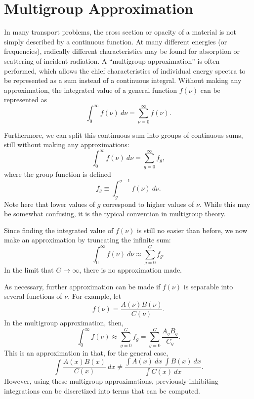 \section{Multigroup Approximation}\label{apxMultigroup}

In many transport problems, the cross section or opacity of a material is not
simply described by a continuous function.  At many different energies (or
frequencies), radically different characteristics may be found for absorption
or scattering of incident radiation.  A ``multigroup approximation'' is often
performed, which allows the chief characteristics of individual energy spectra
to be represented as a sum instead of a continuous integral.  Without making
any approximation, the integrated value of a general function $f(\nu)$ can be
represented as
\[\int_0^\infty f(\nu)\ d\nu = \sum_{\nu=0}^\infty f(\nu).\]

Furthermore, we can split this continuous sum into groups of continuous sums,
still without making any approximations:
\[\int_0^\infty f(\nu)\ d\nu = \sum_{g=0}^\infty f_g,\]
where the group function is defined
\[f_g\equiv\int_g^{g-1} f(\nu)\ d\nu.\]
Note here that lower values of $g$ correspond to higher values of $\nu$.  While
this may be somewhat confusing, it is the typical convention in multigroup
theory.

Since finding the integrated value of $f(\nu)$ is still no easier than before,
we now make an approximation by truncating the infinite sum:
\[\int_0^\infty f(\nu)\ d\nu \approx \sum_{g=0}^G f_g.\]
In the limit that $G\to\infty$, there is no approximation made.

As necessary, further approximation can be made if $f(\nu)$ is separable into
several functions of $\nu$.  For example, let
\[f(\nu) = \frac{A(\nu)B(\nu)}{C(\nu)}.\]
In the multigroup approximation, then,
\[\int_0^\infty f(\nu) \approx \sum_{g=0}^G f_g
   = \sum_{g=0}^G \frac{A_gB_g}{C_g}.\]
This is an approximation in that, for the general case,
\[\int \frac{A(x)B(x)}{C(x)}\ dx
   \neq \frac{\int A(x)\ dx\ \int B(x)\ dx}{\int C(x)\ dx}.\]
However, using these multigroup approximations, previously-inhibiting
integrations can be discretized into terms that can be computed.

